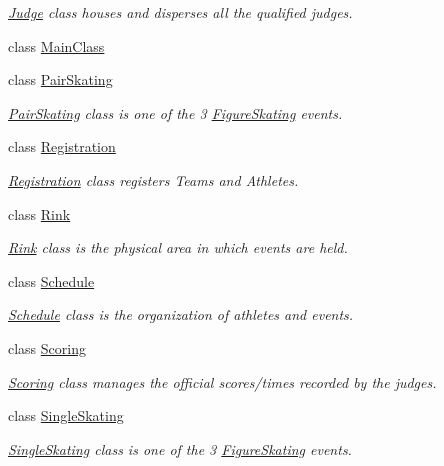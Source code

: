 \begin{DoxyCompactItemize}
\begin{DoxyCompactList}\small\item\em \hyperlink{classPCO_1_1Judge}{Judge} class houses and disperses all the qualified judges. \end{DoxyCompactList}\item 
class \hyperlink{classPCO_1_1MainClass}{Main\+Class}
\item 
class \hyperlink{classPCO_1_1PairSkating}{Pair\+Skating}
\begin{DoxyCompactList}\small\item\em \hyperlink{classPCO_1_1PairSkating}{Pair\+Skating} class is one of the 3 \hyperlink{classPCO_1_1FigureSkating}{Figure\+Skating} events. \end{DoxyCompactList}\item 
class \hyperlink{classPCO_1_1Registration}{Registration}
\begin{DoxyCompactList}\small\item\em \hyperlink{classPCO_1_1Registration}{Registration} class registers Teams and Athletes. \end{DoxyCompactList}\item 
class \hyperlink{classPCO_1_1Rink}{Rink}
\begin{DoxyCompactList}\small\item\em \hyperlink{classPCO_1_1Rink}{Rink} class is the physical area in which events are held. \end{DoxyCompactList}\item 
class \hyperlink{classPCO_1_1Schedule}{Schedule}
\begin{DoxyCompactList}\small\item\em \hyperlink{classPCO_1_1Schedule}{Schedule} class is the organization of athletes and events. \end{DoxyCompactList}\item 
class \hyperlink{classPCO_1_1Scoring}{Scoring}
\begin{DoxyCompactList}\small\item\em \hyperlink{classPCO_1_1Scoring}{Scoring} class manages the official scores/times recorded by the judges. \end{DoxyCompactList}\item 
class \hyperlink{classPCO_1_1SingleSkating}{Single\+Skating}
\begin{DoxyCompactList}\small\item\em \hyperlink{classPCO_1_1SingleSkating}{Single\+Skating} class is one of the 3 \hyperlink{classPCO_1_1FigureSkating}{Figure\+Skating} events. \end{DoxyCompactList}\item 

\end{DoxyCompactItemize}
